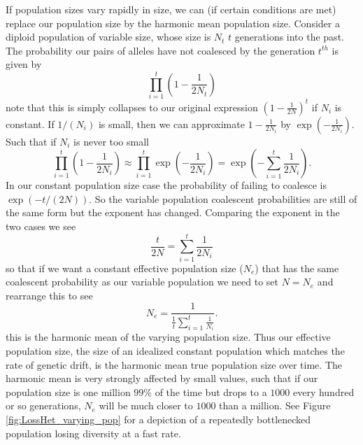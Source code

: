 If population sizes vary rapidly in size, we can (if certain conditions are met)
replace our population size by the harmonic mean population size.
Consider a diploid population of variable size, whose size is $N_t$ $t$ generations into the
past. The probability our pairs of alleles have not coalesced by the generation $t^{th}$ is
given by
\begin{equation}
\prod_{i=1}^{t} \left(1-\frac{1}{2N_t} \right)
\end{equation}
note that this is simply collapses to our original expression
$\left(1-\frac{1}{2N } \right)^t $ if $N_i$ is constant. If $1/(N_i)$ is
small, then we can approximate $1-\frac{1}{2N_i}$ by
$\exp(-\frac{1}{2N_i})$. Such that if $N_i$ is never too small
\begin{equation}
\prod_{i=1}^{t} \left(1-\frac{1}{2N_i} \right)
\approx \prod_{i=1}^{t} \exp \left( -\frac{1}{2N_i} \right)   =
\exp \left(- \sum_{i=1}^{t} \frac{1}{2N_i} \right) .
\end{equation}
In our constant population size case
the probability of failing to coalesce is $\exp(-t/(2N))$. So the
variable population coalescent probabilities are still of the same form but
the exponent has changed. Comparing the exponent in the two cases we see
\begin{equation}
\frac{t}{2N} = \sum_{i=1}^{t} \frac{1}{2N_i}
\end{equation}
so that if we want a constant effective population size ($N_e$) that has the same
coalescent probability as our variable population we need to set
$N=N_e$ and rearrange this to see
\begin{equation}
N_e =\frac{1}{\frac{1}{t} \sum_{i=1}^{t} \frac{1}{N_i} }.
\end{equation}
this is the harmonic mean of the varying population size. Thus our
effective population size, the size of an idealized constant
population which matches the rate of genetic drift, is the harmonic
mean true population size over time. The harmonic mean is very
strongly affected by small values, such that if our population size is
one million $99\%$ of the time but drops to a $1000$ every hundred or
so generations, $N_e$ will be much closer to $1000$ than a
million. See Figure \ref{fig:LossHet_varying_pop}  for a depiction of
a repeatedly bottlenecked population losing diversity at a fast rate.\\

